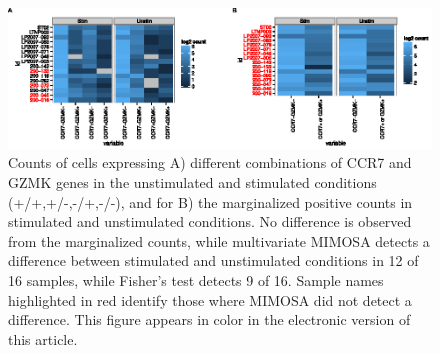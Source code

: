 \documentclass[12pt,oupdraft]{biostatistics}
\begin{document}
\begin{figure}
\centering
\includegraphics{TIKZFig4.eps}
\caption{Counts of cells expressing A) different combinations of CCR7 and GZMK genes in the unstimulated and stimulated conditions (+/+,+/-,-/+,-/-), and for B) the marginalized positive counts in stimulated and unstimulated conditions. No difference is observed from the marginalized counts, while multivariate MIMOSA detects a difference between stimulated and unstimulated conditions in 12 of 16 samples, while Fisher's test detects 9 of 16. Sample names highlighted in red identify those where MIMOSA did not detect a difference. This figure appears in color in the electronic version of this article.}
\label{fig:polyfunctionality}
\end{figure}
\end{document}
